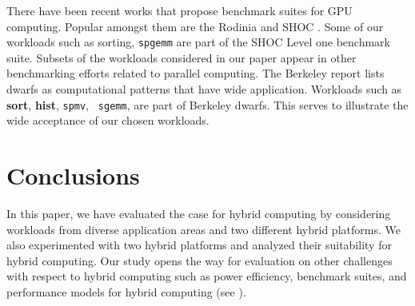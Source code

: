 \documentclass[11pt]{article}
\newcommand{\sgemm} {{\tt spgemm}}
\newcommand{\hist} {{\bf hist}}
\newcommand{\sort} {{\bf sort}}
\begin{document}
There have been recent works that propose benchmark suites for GPU
computing. Popular amongst them are the Rodinia \cite{rodinia} and SHOC
\cite{shoc}. Some of our workloads such as sorting, \sgemm
are part of the SHOC Level one benchmark suite.
Subsets of the workloads considered in our paper appear in other
benchmarking efforts related to parallel computing. The Berkeley report
\cite{landscape} lists dwarfs as computational patterns that have wide
application. Workloads such as \sort, \hist, {\tt spmv}, {\tt
sgemm},  are part of Berkeley dwarfs. This
serves to illustrate the wide acceptance of our chosen workloads.


\section{Conclusions}
\label{sec:concl}
In this paper, we have evaluated the case for hybrid computing
by considering workloads from diverse application areas and two different
hybrid platforms. We also
experimented with two hybrid platforms and analyzed their suitability 
for hybrid computing. 
Our study opens the way
for evaluation on other challenges with respect to hybrid computing such as 
power efficiency, benchmark suites, and performance models
for hybrid computing (see \cite{hipc09,kim09}).


 

 
\end{document}
